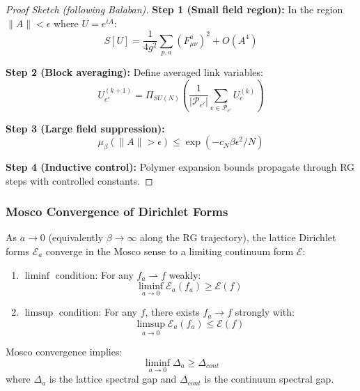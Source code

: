 \begin{proof}[Proof Sketch (following Balaban)]
\textbf{Step 1 (Small field region):}
In the region $\|A\| < \epsilon$ where $U = e^{iA}$:
\begin{equation}
S[U] = \frac{1}{4g^2} \sum_{p,a} (F^a_{\mu\nu})^2 + O(A^4)
\end{equation}

\textbf{Step 2 (Block averaging):}
Define averaged link variables:
\begin{equation}
U_{e'}^{(k+1)} = \Pi_{SU(N)}\left(\frac{1}{|\mathcal{P}_{e'}|} \sum_{e \in \mathcal{P}_{e'}} U_e^{(k)}\right)
\end{equation}

\textbf{Step 3 (Large field suppression):}
\begin{equation}
\mu_\beta(\|A\| > \epsilon) \leq \exp(-c_N \beta \epsilon^2 / N)
\end{equation}

\textbf{Step 4 (Inductive control):}
Polymer expansion bounds propagate through RG steps with controlled constants.
\end{proof}

\subsubsection{Mosco Convergence of Dirichlet Forms}

\begin{theorem}
\label{thm:mosco}
As $a \to 0$ (equivalently $\beta \to \infty$ along the RG trajectory), the lattice Dirichlet forms $\mathcal{E}_a$ converge in the Mosco sense to a limiting continuum form $\mathcal{E}$:
\begin{enumerate}
\item[(M1)] $\liminf$ condition: For any $f_a \rightharpoonup f$ weakly:
\begin{equation}
\liminf_{a \to 0} \mathcal{E}_a(f_a) \geq \mathcal{E}(f)
\end{equation}

\item[(M2)] $\limsup$ condition: For any $f$, there exists $f_a \to f$ strongly with:
\begin{equation}
\limsup_{a \to 0} \mathcal{E}_a(f_a) \leq \mathcal{E}(f)
\end{equation}
\end{enumerate}
\end{theorem}

\begin{theorem}
\label{thm:gap_preservation}
Mosco convergence implies:
\begin{equation}
\liminf_{a \to 0} \Delta_a \geq \Delta_{cont}
\end{equation}
where $\Delta_a$ is the lattice spectral gap and $\Delta_{cont}$ is the continuum spectral gap.
\end{theorem}

